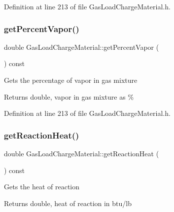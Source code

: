 Definition at line 213 of file Gas\+Load\+Charge\+Material.\+h.

\mbox{\label{class_gas_load_charge_material_a19b8ecfad235b5824b0a88903cff667a}} 
\subsubsection{\texorpdfstring{get\+Percent\+Vapor()}{getPercentVapor()}\hspace{0.1cm}{\footnotesize\ttfamily [3/3]}}
{\footnotesize\ttfamily double Gas\+Load\+Charge\+Material\+::get\+Percent\+Vapor (\begin{DoxyParamCaption}{ }\end{DoxyParamCaption}) const\hspace{0.3cm}{\ttfamily [inline]}}

Gets the percentage of vapor in gas mixture \begin{DoxyReturn}{Returns}
double, vapor in gas mixture as \% 
\end{DoxyReturn}


Definition at line 213 of file Gas\+Load\+Charge\+Material.\+h.

\mbox{\label{class_gas_load_charge_material_a605eaf21d1f25f27b53627aeb903c93d}} 
\subsubsection{\texorpdfstring{get\+Reaction\+Heat()}{getReactionHeat()}\hspace{0.1cm}{\footnotesize\ttfamily [1/3]}}
{\footnotesize\ttfamily double Gas\+Load\+Charge\+Material\+::get\+Reaction\+Heat (\begin{DoxyParamCaption}{ }\end{DoxyParamCaption}) const\hspace{0.3cm}{\ttfamily [inline]}}

Gets the heat of reaction \begin{DoxyReturn}{Returns}
double, heat of reaction in btu/lb 
\end{DoxyReturn}


